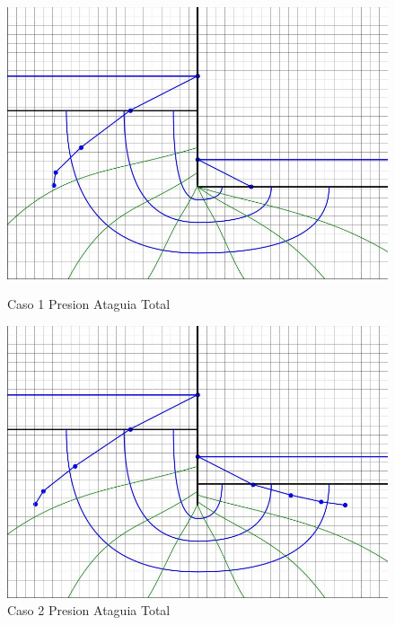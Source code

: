 \begin{figure}[H]
    \centering
    \begin{minipage}{0.32\textwidth}
        \centering
        \includegraphics[width=\textwidth]{GRAFICOS/caso_1_presion_ataguia_total.jpg}
        \caption{Caso 1 Presion Ataguia Total}
        \label{fig:caso_1_presion_ataguia_total}
    \end{minipage}
    \begin{minipage}{0.32\textwidth}
        \centering
        \includegraphics[width=\textwidth]{GRAFICOS/caso_2_presion_ataguia_total.jpg}
        \caption{Caso 2 Presion Ataguia Total}
        \label{fig:caso_2_presion_ataguia_total}
    \end{minipage}
    \begin{minipage}{0.32\textwidth}

\end{minipage}
\end{figure}
